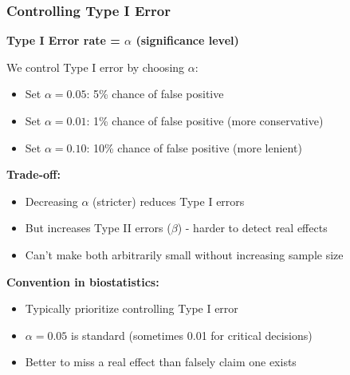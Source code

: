 \documentclass{beamer}
\begin{document}
\begin{frame}
\frametitle{Controlling Type I Error}
\textbf{Type I Error rate = $\alpha$ (significance level)}

\vspace{0.5cm}
We control Type I error by choosing $\alpha$:
\begin{itemize}
\item Set $\alpha = 0.05$: 5\% chance of false positive
\item Set $\alpha = 0.01$: 1\% chance of false positive (more conservative)
\item Set $\alpha = 0.10$: 10\% chance of false positive (more lenient)
\end{itemize}

\vspace{0.5cm}
\textbf{Trade-off:}
\begin{itemize}
\item Decreasing $\alpha$ (stricter) reduces Type I errors
\item But increases Type II errors ($\beta$) - harder to detect real effects
\item Can't make both arbitrarily small without increasing sample size
\end{itemize}

\vspace{0.5cm}
\textbf{Convention in biostatistics:}
\begin{itemize}
\item Typically prioritize controlling Type I error
\item $\alpha = 0.05$ is standard (sometimes 0.01 for critical decisions)
\item Better to miss a real effect than falsely claim one exists
\end{itemize}
\end{frame}
\end{document}
